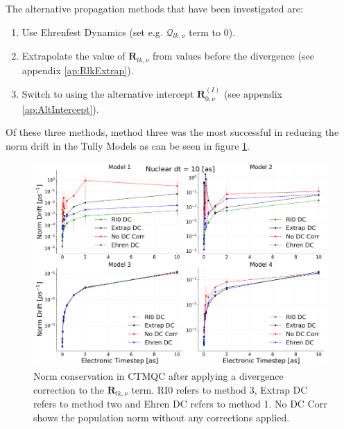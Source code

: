\noindent The alternative propagation methods that have been investigated are:
\begin{enumerate}
	\item Use Ehrenfest Dynamics (set e.g. $\mathcal{Q}_{lk, \nu}$ term to 0).
	\item Extrapolate the value of $\mathbf{R}_{lk, \nu}$ from values before the divergence (see appendix \ref{ap:RlkExtrap}).
	\item Switch to using the alternative intercept $\mathbf{R}_{0, \nu}^{(I)}$ (see appendix \ref{ap:AltIntercept}).
\end{enumerate}
Of these three methods, method three was the most successful in reducing the norm drift in the Tully Models as can be seen in figure \ref{fig:NormConsCorr}.
\begin{figure}[ht]
	\includegraphics[width=\textwidth]{../img/CTMQC/TullyModels/CTMQC_Norm_Conservation_wCorr.png}
	\caption{\label{fig:NormConsCorr}Norm conservation in CTMQC after applying a divergence correction to the $\mathbf{R}_{lk, \nu}$ term. RI0 refers to method 3, Extrap DC refers to method two and Ehren DC refers to method 1. No DC Corr shows the population norm without any corrections applied.}
\end{figure}
\\
